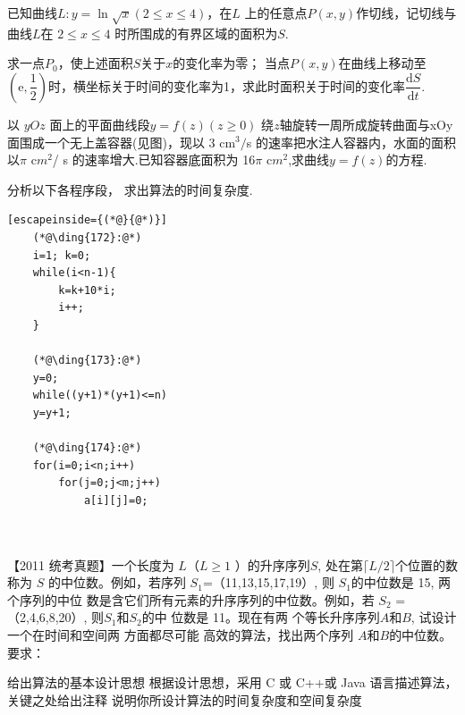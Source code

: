 \documentclass[standard, analysis]{ExBook}
\begin{document}
\begin{qitems}
    
    \begin{bbox}
        \qitem  已知曲线$L:y=\ln\sqrt{x}(2\leqslant x\leqslant4)$，在$L$ 上的任意点$P(x,y)$作切线，记切线与曲线$L$在 $2\leqslant x\leqslant4$
        时所围成的有界区域的面积为$S$.
        \begin{subqitems}
            \subqitem 求一点$P_0$，使上述面积$S$关于$x$的变化率为零；
            \subqitem 当点$P(x,y)$在曲线上移动至$(\mathrm{e},\dfrac{1}{2})$时，横坐标关于时间的变化率为1，求此时面积关于时间的变化率$\dfrac{\mathrm{d}S}{\mathrm{d}t}.$
        \end{subqitems}
    \end{bbox}

    \begin{bbox}
        \qitem 以 $yOz$ 面上的平面曲线段$y=f(z)(z\geqslant0)$ 绕$z$轴旋转一周所成旋转曲面与xOy 面围成一个无上盖容器(见图)，现以 3 cm$^3/$s 的速率把水注人容器内，水面的面积以$\pi$ c$m^2$/ s 的速率增大.已知容器底面积为 16$\pi$ c$m^2$,求曲线$y=f(z)$的方程.
    \end{bbox}

    \begin{bbox}
        \qitem   分析以下各程序段， 求出算法的时间复杂度.
        \begin{lstlisting}[escapeinside={(*@}{@*)}]
    (*@\ding{172}:@*)
    i=1; k=0;
    while(i<n-1){
        k=k+10*i;
        i++;
    }

    (*@\ding{173}:@*)
    y=0;
    while((y+1)*(y+1)<=n)
    y=y+1;

    (*@\ding{174}:@*)
    for(i=0;i<n;i++)
        for(j=0;j<m;j++)
            a[i][j]=0;
    
        
        \end{lstlisting}
    \end{bbox}

    \begin{bbox}
        \qitem   【2011 统考真题】一个长度为 $L$（$L\geqslant 1$ ）的升序序列$ S$, 处在第$\lceil L/2\rceil $个位置的数称为 $S$
        的中位数。例如，若序列 $S_1$=（11,13,15,17,19）, 则 $S_1$的中位数是 15, 两 个序列的中位
        数是含它们所有元素的升序序列的中位数。例如，若 $S_2$ =（2,4,6,8,20）, 则$S_1$和$S_2$的中
        位数是 11。现在有两 个等长升序序列$A$和$B$, 试设计一个在时间和空间两 方面都尽可能
        高效的算法，找出两个序列 $A$和$B$的中位数。要求：
        \begin{subqitems}
            \subqitem 给出算法的基本设计思想
            \subqitem  根据设计思想，采用 C 或 C++或 Java 语言描述算法，关键之处给出注释
            \subqitem 说明你所设计算法的时间复杂度和空间复杂度
        \end{subqitems}
    \end{bbox}

\end{qitems}
\end{document}
